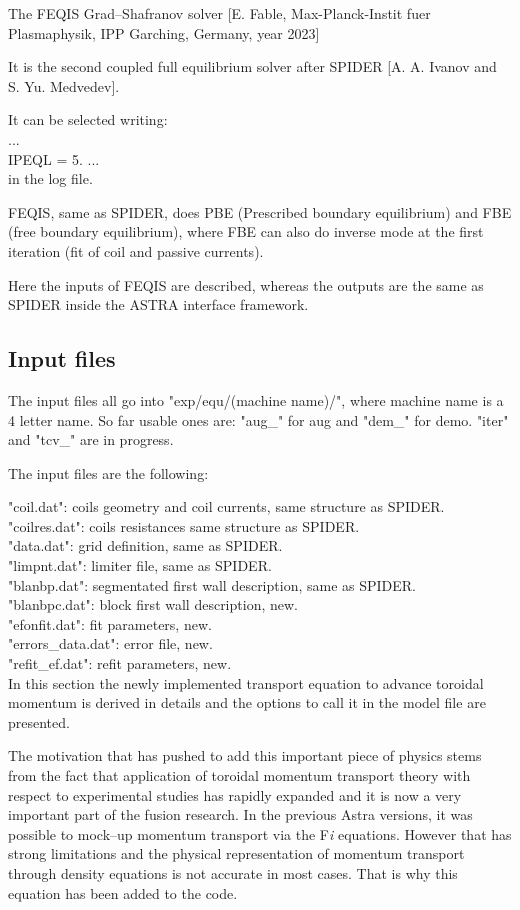 The FEQIS Grad--Shafranov solver [E. Fable, Max-Planck-Instit fuer Plasmaphysik, IPP Garching, Germany, year 2023]

It is the second coupled full equilibrium solver after SPIDER [A. A. Ivanov and S. Yu. Medvedev].

It can be selected writing: \\
...\\
IPEQL  =  5.
...\\
in the log file.

FEQIS, same as SPIDER, does PBE (Prescribed boundary equilibrium) and FBE (free boundary equilibrium), where FBE can also do inverse mode at the first iteration (fit of coil and passive currents).

Here the inputs of FEQIS are described, whereas the outputs are the same as SPIDER inside the ASTRA interface framework.

\subsection{Input files}
The input files all go into "exp/equ/(machine name)/", where machine name is a 4 letter name.
So far usable ones are: "aug\_" for aug and "dem\_" for demo. "iter" and "tcv\_" are in progress.

The input files are the following:

"coil.dat": coils geometry and coil currents, same structure as SPIDER.\\
"coilres.dat": coils resistances same structure as SPIDER.\\
"data.dat": grid definition, same as SPIDER.\\
"limpnt.dat": limiter file, same as SPIDER.\\
"blanbp.dat": segmentated first wall description, same as SPIDER.\\
"blanbpc.dat": block first wall description, new.\\
"efonfit.dat": fit parameters, new.\\
"errors_data.dat": error file, new. \\
"refit_ef.dat": refit parameters, new. \\


In this section the newly implemented transport equation to advance toroidal
momentum is derived in details and the options to call it in the model file are
presented.

The motivation that has pushed to add this important piece of physics stems from
the fact that application of toroidal momentum transport theory with respect to
experimental studies has rapidly expanded and it is now a very important part of
the fusion research. In the previous Astra versions, it was possible to mock--up
momentum transport via the F{\it i} equations. However that has strong
limitations and the physical representation of momentum transport through
density equations is not accurate in most cases. That is why this equation has
been added to the code.

